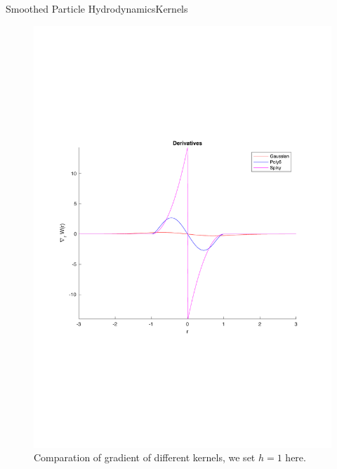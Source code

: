 \documentclass{beamer}
\begin{document}
\begin{frame}{Smoothed Particle Hydrodynamics}{Kernels}
\begin{figure}
        \centering
        \includegraphics[scale = 0.3]{../report/Figures/kenels_de}
        \caption{Comparation of gradient of different kernels, we set $h = 1$ here. }
\end{figure}
\end{frame}

\begin{frame}
\end{frame}
\end{document}
